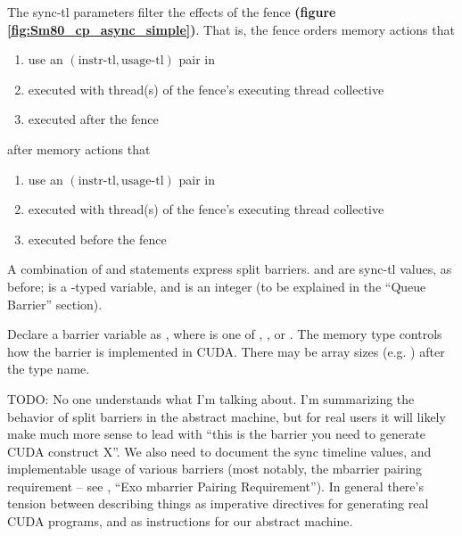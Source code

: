 \filbreak 
The sync-tl parameters filter the effects of the fence \textbf{(figure \ref{fig:Sm80_cp_async_simple})}.
That is, the fence orders memory actions that
\begin{enumerate}
  \item use an $(\text{instr-tl}, \text{usage-tl})$ pair in 
  \item executed with thread(s) of the fence's executing thread collective
  \item executed after the fence
\end{enumerate}
\filbreak
after memory actions that
\begin{enumerate}
  \item use an $(\text{instr-tl}, \text{usage-tl})$ pair in 
  \item executed with thread(s) of the fence's executing thread collective
  \item executed before the fence
\end{enumerate}

\filbreak
{}

A combination of  and  statements express split barriers.
 and  are sync-tl values, as before;  is a -typed variable, and  is an integer (to be explained in the ``Queue Barrier'' section).

\filbreak
Declare a barrier variable as , where  is one of , , or .
The memory type controls how the barrier is implemented in CUDA.
There may be array sizes (e.g. \lighttt{[4,2]}) after the  type name.

\filbreak
TODO: No one understands what I'm talking about.
I'm summarizing the behavior of split barriers in the abstract machine, but for real users it will likely make much more sense to lead with ``this is the barrier you need to generate CUDA construct X''.
We also need to document the sync timeline values, and implementable usage of various barriers (most notably, the mbarrier pairing requirement -- see , ``Exo mbarrier Pairing Requirement'').
In general there's tension between describing things as imperative directives for generating real CUDA programs, and as instructions for our abstract machine.

